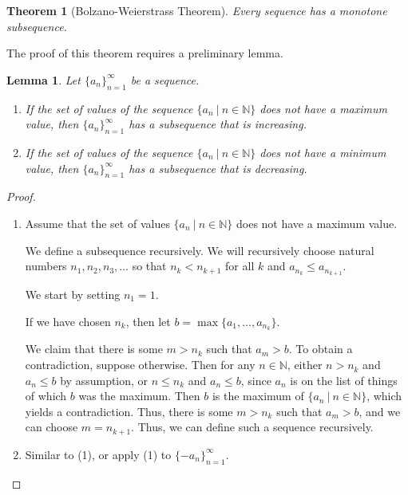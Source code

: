 \documentclass[12pt]{amsart}
\newcommand{\N}{\mathbb{N}}
\numberwithin{equation}{section}
\theoremstyle{plain} %
\newtheorem{thm}[equation]{Theorem}
\newtheorem{lem}[equation]{Lemma}
\theoremstyle{definition}
\theoremstyle{remark}
\begin{document}
\begin{thm}[Bolzano-Weierstrass Theorem]\label{thm214}
Every sequence has a monotone subsequence.
\end{thm}



The proof of this theorem requires a preliminary lemma.



\begin{lem} \label{lem214a} Let $\{a_n\}_{n=1}^\infty$ be a sequence.
\begin{enumerate}
\item If the set of values of the sequence  $\{a_n \ | \ n\in \N\}$ does not have a maximum value, then $\{a_n\}_{n=1}^\infty$ has a subsequence that is increasing. 
 \item If the set of values of the sequence  $\{a_n \ | \ n\in \N\}$ does not have a minimum value, then $\{a_n\}_{n=1}^\infty$ has a subsequence that is decreasing. 
\end{enumerate}
\end{lem}

\begin{proof}
\begin{enumerate}
\item Assume that the set of values $\{a_n \ | \ n\in \N\}$ does not have a maximum value.

We define a subsequence recursively. We will recursively choose natural numbers $n_1, n_2, n_3,\dots$ so that $n_k < n_{k+1}$ for all $k$ and $a_{n_k} \leq a_{n_{k+1}}$.

We start by setting $n_1 = 1$.

If we have chosen $n_k$, then let $b=\max\{a_1,\dots,a_{n_k}\}$. 

We claim that there is some $m> n_k$ such that $a_m> b$. To obtain a contradiction, suppose otherwise. Then for any $n\in \N$, either $n>{n_k}$ and $a_n \leq b$ by assumption, or $n\leq n_k$ and $a_n \leq b$, since $a_n$ is on the list of things of which $b$ was the maximum. Then $b$ is the maximum of $\{a_n \ | \ n\in \N\}$, which yields a contradiction. Thus, there is some $m> n_k$ such that $a_m> b$, and we can choose $m=n_{k+1}$. Thus, we can define such a sequence recursively.
\item Similar to (1), or apply (1) to $\{-a_n\}_{n=1}^\infty$.\qedhere
\end{enumerate}
\end{proof}
\end{document}
